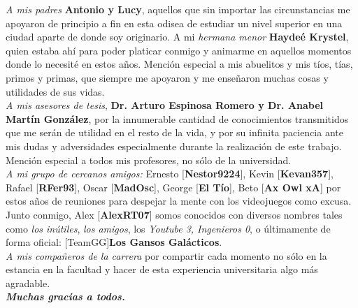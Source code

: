 \documentclass[
11pt, %
spanish, %
singlespacing, %
headsepline, %
]{MastersDoctoralThesis} %
\begin{document}
\begin{acknowledgements}
\addchaptertocentry{\acknowledgementname} %
\textit{A mis padres} \textbf{Antonio y Lucy}, aquellos que sin importar las circunstancias me apoyaron de principio a fin en esta odisea de estudiar un nivel superior en una ciudad aparte de donde soy originario. A mi \textit{hermana menor} \textbf{Haydeé Krystel}, quien estaba ahí para poder platicar conmigo y animarme en aquellos momentos donde lo necesité en estos años. Mención especial a mis abuelitos y mis tíos, tías, primos y primas, que siempre me apoyaron y me enseñaron muchas cosas y utilidades de sus vidas. \\

\textit{A mis asesores de tesis}, \textbf{Dr. Arturo Espinosa Romero y Dr. Anabel Martín González}, por la innumerable cantidad de conocimientos transmitidos que me serán de utilidad en el resto de la vida, y por su infinita paciencia ante mis dudas y adversidades especialmente durante la realización de este trabajo. Mención especial a todos mis profesores, no sólo de la universidad. \\

\textit{A mi grupo de cercanos amigos:} Ernesto [\textbf{Nestor9224}], Kevin [\textbf{Kevan357}], Rafael [\textbf{RFer93}], Oscar [\textbf{MadOsc}], George [\textbf{El Tío}], Beto [\textbf{Ax Owl xA}] por estos años de reuniones para despejar la mente con los videojuegos como excusa. Junto conmigo, Alex [\textbf{AlexRT07}] somos conocidos con diversos nombres tales como \textit{los inútiles}, \textit{los amigos}, los \textit{Youtube 3, Ingenieros 0}, o últimamente de forma oficial: [TeamGG]\textbf{Los Gansos Galácticos}. \\

\textit{A mis compañeros de la carrera} por compartir cada momento no sólo en la estancia en la facultad y hacer de esta experiencia universitaria algo más agradable. \\

\textbf{\textit{\Large Muchas gracias a todos.}}

\end{acknowledgements} 

\tableofcontents %
\end{document}
